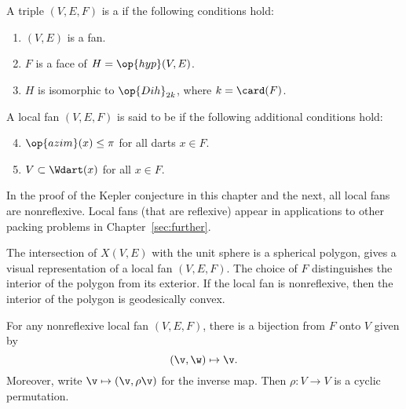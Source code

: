 \begin{definition} \label{def:convex-local}
A triple $(V,E,F)$ is a  if the following conditions hold:
\begin{enumerate} 
\item {} $(V,E)$ is a fan.
\item {} $F$ is a face of $H = \op{hyp}(V,E)$.
\item {} $H$ is isomorphic to $\op{Dih}_{2k}$, where $k =
\card(F)$.
\end{enumerate}
A local fan $(V,E,F)$ is said to be  if the following
additional conditions hold:
\begin{enumerate}
\setcounter{enumi}{3}
\item %
 $\op{azim}(x)\le \pi$ for all darts $x\in F$.
\item {} $V\subset \Wdart(x)$ for all $x\in F$.
\end{enumerate}
\end{definition}
%

In the proof of the Kepler conjecture in this chapter and the next,
all local fans are nonreflexive.  Local fans (that are reflexive) appear in
applications to other packing problems in Chapter~\ref{sec:further}.

\begin{remark}[visualization]
  The intersection of $X(V,E)$ with the unit sphere is a spherical
  polygon, gives a visual representation of a local fan $(V,E,F)$.
  The choice of $F$ distinguishes the interior of the polygon from its
  exterior.  If the local fan is nonreflexive, then the interior of the
  polygon is geodesically convex.
\end{remark}


\begin{lemma}[]%
For any nonreflexive local fan $(V,E,F)$, there is a bijection from $F$ onto $V$
given by
\[ 
(\v,\w) \mapsto \v.
\] 
Moreover, write $\v\mapsto(\v,\rho\v)$ for the inverse map. 
Then $\rho:V\to V$ is a cyclic permutation.
\end{lemma}
%

